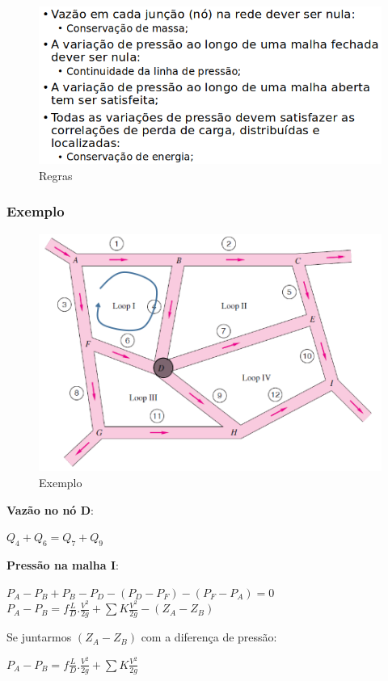 \documentclass[a4paper, 12pt]{article}
\begin{document}
	\begin{figure}[h]
		\centering
		\includegraphics[width=0.8\linewidth]{imagens/regras}
		\caption{Regras}
		\label{fig:regras}
	\end{figure}
	
\newpage
\subsubsection{Exemplo}
	\begin{figure}[h]
		\centering
		\includegraphics[width=0.8\linewidth]{imagens/rt}
		\caption{Exemplo}
		\label{fig:rt}
	\end{figure}
	\textbf{Vazão no nó D}:\\
	\begin{center}
		\Large
		$
		Q_4 + Q_6 = Q_7 + Q_9
		$
	\end{center}
	\textbf{Pressão na malha I}:\\
		\begin{center}
			\Large
			$
			P_A - P_B + P_B - P_D - (P_D - P_F) - (P_F - P_A) = 0
			$\\
			$
			P_A - P_B = f \frac{L}{D}. \frac{V^2}{2g} + \sum K \frac{V^2}{2g} - (Z_A - Z_B)
			$
		\end{center}
	Se juntarmos $(Z_A-Z_B)$ com a diferença de pressão:
		\begin{center}
			\Large
			$
			P_A - P_B = f \frac{L}{D}. \frac{V^2}{2g} + \sum K \frac{V^2}{2g} 
			$
		\end{center}
\newpage
\end{document}

